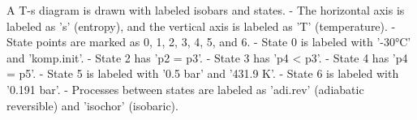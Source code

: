 A T-s diagram is drawn with labeled isobars and states.  
- The horizontal axis is labeled as 's' (entropy), and the vertical axis is labeled as 'T' (temperature).  
- State points are marked as 0, 1, 2, 3, 4, 5, and 6.  
- State 0 is labeled with '-30°C' and 'komp.init'.  
- State 2 has 'p2 = p3'.  
- State 3 has 'p4 < p3'.  
- State 4 has 'p4 = p5'.  
- State 5 is labeled with '0.5 bar' and '431.9 K'.  
- State 6 is labeled with '0.191 bar'.  
- Processes between states are labeled as 'adi.rev' (adiabatic reversible) and 'isochor' (isobaric).